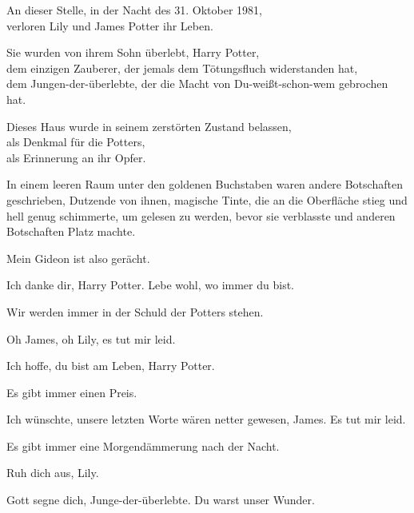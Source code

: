 \begin{center}
An dieser Stelle, in der Nacht des 31. Oktober 1981,\\
verloren Lily und James Potter ihr Leben.

Sie wurden von ihrem Sohn überlebt, Harry Potter,\\
dem einzigen Zauberer, der jemals dem Tötungsfluch widerstanden hat,\\
dem Jungen-der-überlebte, der die Macht von Du-weißt-schon-wem gebrochen hat.

Dieses Haus wurde in seinem zerstörten Zustand belassen,\\
als Denkmal für die Potters,\\
als Erinnerung an ihr Opfer.
\end{center}

In einem leeren Raum unter den goldenen Buchstaben waren andere Botschaften geschrieben, Dutzende von ihnen, magische Tinte, die an die Oberfläche stieg und hell genug schimmerte, um gelesen zu werden, bevor sie verblasste und anderen Botschaften Platz machte.

\begin{center}
Mein Gideon ist also gerächt.

Ich danke dir, Harry Potter. Lebe wohl, wo immer du bist.

Wir werden immer in der Schuld der Potters stehen.

Oh James, oh Lily, es tut mir leid.

Ich hoffe, du bist am Leben, Harry Potter.

Es gibt immer einen Preis.

Ich wünschte, unsere letzten Worte wären netter gewesen, James.
Es tut mir leid.

Es gibt immer eine Morgendämmerung nach der Nacht.

Ruh dich aus, Lily.

Gott segne dich, Junge-der-überlebte. Du warst unser Wunder.
\end{center}

